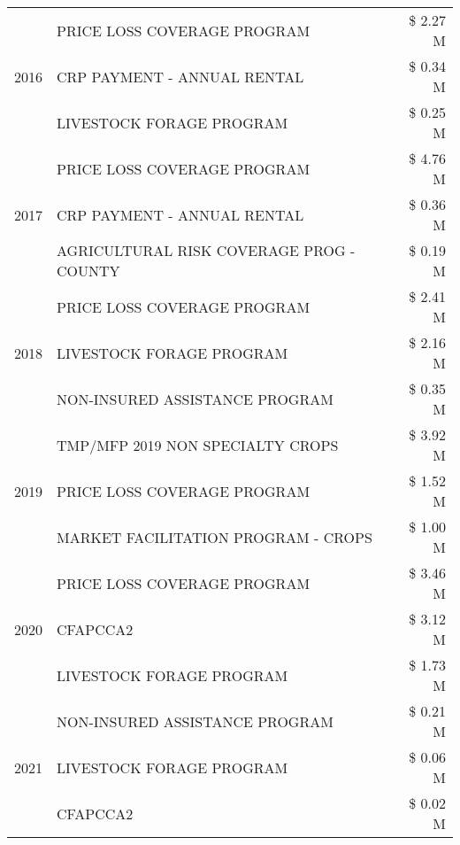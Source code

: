 \begin{tabular}{llr}
\cline{1-3}
\multirow[t]{3}{*}{2016} & PRICE LOSS COVERAGE PROGRAM & \$ 2.27 M \\
 & CRP PAYMENT - ANNUAL RENTAL & \$ 0.34 M \\
 & LIVESTOCK FORAGE PROGRAM & \$ 0.25 M \\
\cline{1-3}
\multirow[t]{3}{*}{2017} & PRICE LOSS COVERAGE PROGRAM & \$ 4.76 M \\
 & CRP PAYMENT - ANNUAL RENTAL & \$ 0.36 M \\
 & AGRICULTURAL RISK COVERAGE PROG - COUNTY & \$ 0.19 M \\
\cline{1-3}
\multirow[t]{3}{*}{2018} & PRICE LOSS COVERAGE PROGRAM & \$ 2.41 M \\
 & LIVESTOCK FORAGE PROGRAM & \$ 2.16 M \\
 & NON-INSURED ASSISTANCE PROGRAM & \$ 0.35 M \\
\cline{1-3}
\multirow[t]{3}{*}{2019} & TMP/MFP 2019 NON SPECIALTY CROPS & \$ 3.92 M \\
 & PRICE LOSS COVERAGE PROGRAM & \$ 1.52 M \\
 & MARKET FACILITATION PROGRAM - CROPS & \$ 1.00 M \\
\cline{1-3}
\multirow[t]{3}{*}{2020} & PRICE LOSS COVERAGE PROGRAM & \$ 3.46 M \\
 & CFAPCCA2 & \$ 3.12 M \\
 & LIVESTOCK FORAGE PROGRAM & \$ 1.73 M \\
\cline{1-3}
\multirow[t]{3}{*}{2021} & NON-INSURED ASSISTANCE PROGRAM & \$ 0.21 M \\
 & LIVESTOCK FORAGE PROGRAM & \$ 0.06 M \\
 & CFAPCCA2 & \$ 0.02 M \\
\cline{1-3}
\bottomrule
\end{tabular}
